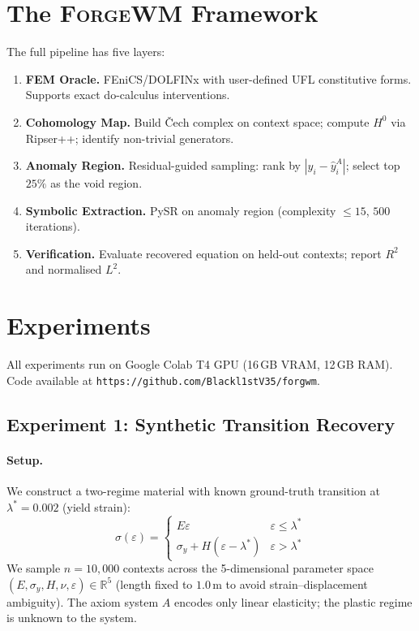\documentclass[twoside,11pt]{article}
\newcommand{\ForgeWM}{\textsc{ForgeWM}\xspace}
\newcommand{\LAMBDASTAR}{\lambda^*}
\begin{document}
\section{The \ForgeWM Framework}
\label{sec:framework}

The full pipeline has five layers:

\begin{enumerate}[label=\textbf{L\arabic*.}]
\item \textbf{FEM Oracle.} FEniCS/DOLFINx with user-defined UFL
  constitutive forms. Supports exact do-calculus interventions.
\item \textbf{Cohomology Map.} Build \v{C}ech complex on context
  space; compute $H^0$ via Ripser++; identify non-trivial generators.
\item \textbf{Anomaly Region.} Residual-guided sampling: rank by
  $|y_i - \hat{y}^A_i|$; select top $25\%$ as the void region.
\item \textbf{Symbolic Extraction.} PySR on anomaly region
  (complexity $\leq 15$, $500$ iterations).
\item \textbf{Verification.} Evaluate recovered equation on held-out
  contexts; report $R^2$ and normalised $L^2$.
\end{enumerate}

\section{Experiments}
\label{sec:experiments}

All experiments run on Google Colab T4 GPU (16\,GB VRAM,
12\,GB RAM). Code available at \texttt{https://github.com/Blackl1stV35/forgwm}.

\subsection{Experiment 1: Synthetic Transition Recovery}
\label{sec:exp1}

\paragraph{Setup.}
We construct a two-regime material with known ground-truth transition
at $\LAMBDASTAR = 0.002$ (yield strain):
\[
  \sigma(\varepsilon) =
  \begin{cases}
    E\varepsilon & \varepsilon \leq \LAMBDASTAR \\
    \sigma_y + H(\varepsilon - \LAMBDASTAR) & \varepsilon > \LAMBDASTAR
  \end{cases}
\]
We sample $n = 10{,}000$ contexts across the 5-dimensional parameter
space $(E, \sigma_y, H, \nu, \varepsilon) \in \mathbb{R}^5$
(length fixed to $1.0$\,m to avoid strain--displacement ambiguity).
The axiom system $A$ encodes only linear elasticity; the plastic
regime is unknown to the system.
\end{document}
